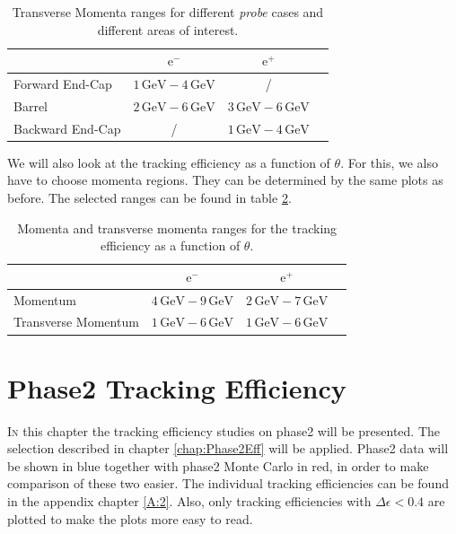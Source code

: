 \documentclass[a4paper,11pt,twosided,final,german,openbib,pdftex,listof=totoc,bibliography=totoc]{scrbook}
\begin{document}
\begin{table}[h!]
	\centering
	\begin{tabular}{lccc}
		&$\textrm{e}^-$ &$\textrm{e}^+$\\
		\hline
		Forward End-Cap &$1\,\textrm{GeV} - 4\,\textrm{GeV}$&/\\
		Barrel &$2\,\textrm{GeV} - 6\,\textrm{GeV}$&$3\,\textrm{GeV} - 6\,\textrm{GeV}$\\
		Backward End-Cap & /&$1\,\textrm{GeV} - 4\,\textrm{GeV}$\\
	\end{tabular}
	
	\caption[Areas Of Interest Different Transverse Momenta Ranges]{Transverse Momenta ranges for different \textit{probe} cases and different areas of interest.}
	\label{tab:RTPtMDTable}
\end{table}

We will also look at the tracking efficiency as a function of $\theta$. For this, we also have to choose momenta regions. They can be determined by the same plots as before.
The selected ranges can be found in table \ref{tab:RTPMDThetaTable}.

\begin{table}[h!]
	\centering
	\begin{tabular}{lccc}
		&$\textrm{e}^-$ &$\textrm{e}^+$\\
		\hline
		Momentum &$4\,\textrm{GeV} - 9\,\textrm{GeV}$&$2\,\textrm{GeV} - 7\,\textrm{GeV}$\\
		Transverse Momentum &$1\,\textrm{GeV} - 6\,\textrm{GeV}$&$1\,\textrm{GeV} - 6\,\textrm{GeV}$\\

	\end{tabular}
	
	\caption[Different (Transverse-) Momenta Ranges For $\theta$ Efficiency]{Momenta and transverse momenta ranges for the tracking efficiency as a function of $\theta$.}
	\label{tab:RTPMDThetaTable}
\end{table}

\chapter{Phase2 Tracking Efficiency}
\label{chp:TrackingEfficiencyPhase2}



\lettrine{I}{n} this chapter the tracking efficiency studies on phase2 will be presented. The selection described in chapter \ref{chap:Phase2Eff} will be applied. Phase2 data will be shown in blue together with phase2 Monte Carlo in red, in order to make comparison of these two easier. The individual tracking efficiencies can be found in the appendix chapter \ref{A:2}. Also, only tracking efficiencies with $\Delta \epsilon < 0.4$ are plotted to make the plots more easy to read. 
\newline
 
\end{document}
